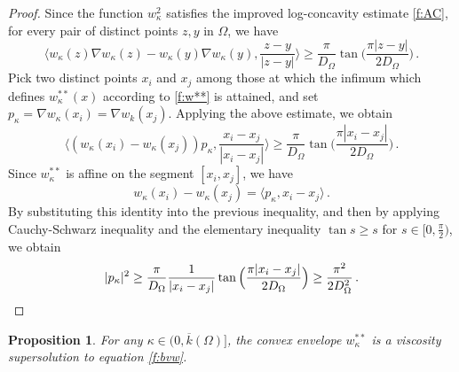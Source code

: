 \documentclass[11pt]{amsart}
\newtheorem{proposition}[theorem]{Proposition}
\theoremstyle{definition}
\theoremstyle{remark}
\def\Om{\Omega}
\def\k{\kappa}
\begin{document}
\begin{proof} 
Since the function $w _\k ^ 2$ satisfies the improved log-concavity estimate \eqref{f:AC},  for every pair of distinct points $z, y$ in $\Om$, we have
  $$
 \langle  w _\k ( z) \nabla w _\k ( z) - w _\k (y) \nabla w _\k ( y), \frac{ z-y }{|z-y |}  \rangle 
\geq \frac{ \pi }{D_\Om} \tan \Big (   \frac{\pi  |z-y| }{2 D_\Om}  \Big ) \,.
$$
Pick  two distinct points $x_i$ and $x _j$ among those at which the infimum which defines   $w _\k   ^ { **}  (x)$ according to
\eqref{f:w**} is attained, and set 
 $p _\k = \nabla w _\k ( x_i) = \nabla w _k ( x_j)$.
  Applying the above estimate,  we obtain
 $$
 \langle   (w _\k  ( x_i )- w_\k   ( x_j) ) p  _\k , \frac{ x_i-x_j }{|x_i-x_j|}  \rangle 
\geq \frac{ \pi }{D_\Om} \tan \Big (   \frac{\pi  |x_i-x_j| }{2 D_\Om}  \Big )  \,.
$$
Since $w_\k ^{**}   $ is affine on the segment $[x_i, x_j]$, we have
  $$w_\k   ( x_i )- w_\k   ( x_j)  = \langle p_\k, x_i - x_j \rangle  \,.$$ 
By substituting this identity into the previous inequality, and then by applying Cauchy-Schwarz inequality 
 and the elementary inequality $\tan s \geq s$ for $s\in [0, \frac{\pi}{2}) $, 
we obtain
 \[
|p_\k| ^ 2 \geq  \frac{ \pi }{D_\Om} \frac{1}{ |x_i-x_j| }   \tan \Big (   \frac{\pi  |x_i-x_j| }{2 D_\Om}  \Big )   
\geq   \frac{\pi ^ 2}{2 D _\Om ^ 2} \,.
\qedhere 
\]
\end{proof}

\bigskip
 
\begin{proposition}\label{p:viscosuper}   
For any $\k \in (0, \overline k (\Om)]$, the convex envelope $w  _\k ^{**}$ is a viscosity  supersolution  to   equation \eqref{f:bvw}. 
  \end{proposition} 
\end{document}
